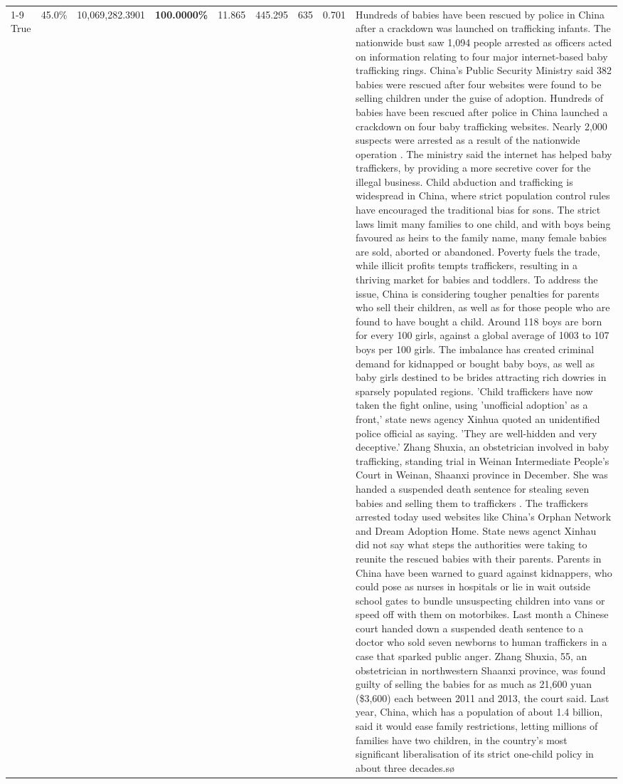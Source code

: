 \begin{table}[H]
\begin{tabular}{lllrlllll}
\cline{1-9}
True & 45.0\% & 10,069,282.3901 & \bfseries \color{red} 100.0000\% & 11.865 & 445.295 & 635 & 0.701 & Hundreds of babies have been rescued by police in China after a crackdown was launched on trafficking infants. The nationwide bust saw 1,094 people arrested as officers acted on information relating to four major internet-based baby trafficking rings. China's Public Security Ministry said 382 babies were rescued after four websites were found to be selling children under the guise of adoption. Hundreds of babies have been rescued after police in China launched a crackdown on four baby trafficking websites. Nearly 2,000 suspects were arrested as a result of the nationwide operation . The ministry said the internet has helped baby traffickers, by providing a more secretive cover for the illegal business. Child abduction and trafficking is widespread in China, where strict population control rules have encouraged the traditional bias for sons. The strict laws limit many families to one child, and with boys being favoured as heirs to the family name, many female babies are sold, aborted or abandoned. Poverty fuels the trade, while illicit profits tempts traffickers, resulting in a thriving market for babies and toddlers. To address the issue, China is considering tougher penalties for parents who sell their children, as well as for those people who are found to have bought a child. Around 118 boys are born for every 100 girls, against a global average of 1003 to 107 boys per 100 girls. The imbalance has created criminal demand for kidnapped or bought baby boys, as well as baby girls destined to be brides attracting rich dowries in sparsely populated regions. 'Child traffickers have now taken the fight online, using 'unofficial adoption' as a front,' state news agency Xinhua quoted an unidentified police official as saying. 'They are well-hidden and very deceptive.' Zhang Shuxia, an obstetrician involved in baby trafficking, standing trial in Weinan Intermediate People's Court in Weinan, Shaanxi province in December. She was handed a suspended death sentence for stealing seven babies and selling them to traffickers . The traffickers arrested today used websites like China's Orphan Network and Dream Adoption Home. State news agenct Xinhau did not say what steps the authorities were taking to reunite the rescued babies with their parents. Parents in China have been warned to guard against kidnappers, who could pose as nurses in hospitals or lie in wait outside school gates to bundle unsuspecting children into vans or speed off with them on motorbikes. Last month a Chinese court handed down a suspended death sentence to a doctor who sold seven newborns to human traffickers in a case that sparked public anger. Zhang Shuxia, 55, an obstetrician in northwestern Shaanxi province, was found guilty of selling the babies for as much as 21,600 yuan (\$3,600) each between 2011 and 2013, the court said. Last year, China, which has a population of about 1.4 billion, said it would ease family restrictions, letting millions of families have two children, in the country's most significant liberalisation of its strict one-child policy in about three decades.sø \\

\end{tabular}
\end{table}

